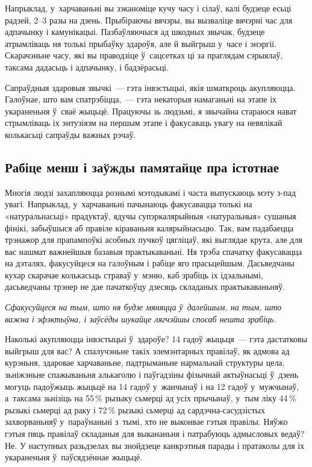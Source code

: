 
Напрыклад, у~харчаваньні вы зэканоміце кучу часу і сілаў, калі будзеце есьці радзей, 2--3 разы на дзень. Прыбіраючы вячэры, вы вызваліце вячэрні час для адпачынку і камунікацыі. Пазбаўляючыся ад шкодных звычак, будзеце атрымліваць ня толькі прыбаўку здароўя, але й выйгрыш у~часе і энэргіі. Скарачэньне часу, які вы праводзіце ў~сацсетках ці за праглядам сэрыялаў, таксама дадасьць і адпачынку, і бадзёрасьці. 

Сапраўдныя здаровыя звычкі~--- гэта інвэстыцыі, якія шматкроць акупляюцца. Галоўнае, што вам спатрэбіцца,~--- гэта некаторыя намаганьні на этапе іх укараненьня ў~сваё жыцьцё. Працуючы зь людзьмі, я звычайна стараюся нават стрымліваць іх энтузіязм на першым этапе і факусаваць увагу на невялікай колькасьці сапраўды важных рэчаў.

\subsection*{Рабіце менш і заўжды памятайце пра істотнае}

Многія людзі захапляюцца рознымі мэтодыкамі і часта выпускаюць мэту з-пад увагі. Напрыклад, у~харчаваньні пачынаюць факусавацца толькі на «натуральнасьці» прадуктаў, ядучы супэркалярыйныя «натуральныя» сушаныя фінікі, забыўшыся аб правіле кіраваньня калярыйнасьцю. Так, вам падабаецца трэнажор для прапампоўкі асобных пучкоў цягліцаў, які выглядае крута, але для вас нашмат важнейшыя базавыя практыкаваньні. Ня трэба спачатку факусавацца на дэталях, факусуйцеся на галоўным і рабіце яго прасьцейшым. Дасьведчаны кухар скарачае колькасьць страваў у~мэню, каб зрабіць іх ідэальнымі, дасьведчаны трэнер не дае пачаткоўцу дзесяць складаных практыкаваньняў.

\emph{Сфакусуйцеся на тым, што ня будзе мяняцца ў~далейшым, на тым, што важна і эфэктыўна, і заўсёды шукайце лягчэйшы спосаб нешта зрабіць.}

Наколькі акупляюцца інвэстыцыі ў~здароўе? 14 гадоў жыцьця~--- гэта дастатковы выйгрыш для вас? А спалучэньне такіх элемэнтарных правілаў, як адмова ад курэньня, здаровае харчаваньне, падтрыманьне нармальнай структуры цела, зьніжэньне спажываньня алькаголю і паўгадзіны фізычнай актыўнасьці ў~дзень могуць падоўжыць жыцьцё на 14 гадоў у~жанчынаў і на 12 гадоў у~мужчынаў, а~таксама зьнізіць на 55\,\% рызыку сьмерці ад усіх прычынаў, у~тым ліку 44\,\% рызыкі сьмерці ад раку і 72\,\% рызыкі сьмерці ад сардэчна-сасудзістых захворваньняў у~параўнаньні з~тымі, хто не выконвае гэтыя правілы. Няўжо гэтыя пяць правілаў складаныя для выкананьня і патрабуюць адмысловых ведаў? Не. У наступных разьдзелах вы знойдзеце канкрэтныя парады і пратаколы для іх укараненьня ў~паўсядзённае жыцьцё.

